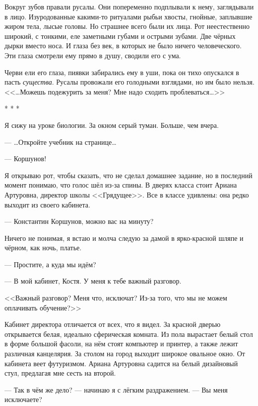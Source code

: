 \documentclass[openany, oneside]{book}
\begin{document}
Вокруг зубов правали русалы. Они попеременно подплывали к нему, заглядывали в лицо. Изуродованные какими-то ритуалами рыбьи хвосты, гнойные, заплывшие жиром тела, лысые головы. Но страшнее всего были их лица. Рот неестественно широкий, с тонкими, еле заметными губами и острыми зубами. Две чёрных дырки вместо носа. И глаза без век, в которых не было ничего человеческого. Эти глаза смотрели ему прямо в душу, сводили его с ума.

Черви ели его глаза, пиявки забирались ему в уши, пока он тихо опускался в пасть \textit{существа}. Русалы провожали его голодными взглядами, но им было нельзя.\\

<<\dots Можешь подежурить за меня? Мне надо сходить проблеваться\dots>>

\begin{center}
    * * *
\end{center}

Я сижу на уроке биологии. За окном серый туман. Больше, чем вчера.

--- \dots Откройте учебник на странице\dots

--- Коршунов!

Я открываю рот, чтобы сказать, что не сделал домашнее задание, но в последний момент понимаю, что голос шёл из-за спины. В дверях класса стоит Ариана Артуровна, директор школы <<Грядущее>>. Все в классе удивлены: она редко выходит из своего кабинета.

--- Константин Коршунов, можно вас на минуту?

Ничего не понимая, я встаю и молча следую за дамой в ярко-красной шляпе и чёрном, как ночь, платье.

--- Простите, а куда мы идём?

--- В мой кабинет, Костя. У меня к тебе важный разговор.

<<Важный разговор? Меня что, исключат? Из-за того, что мы не можем оплачивать обучение?>>

Кабинет директора отличается от всех, что я видел. За красной дверью открывается белая, идеально сферическая комната. Из пола вырастает белый стол в форме большой фасоли, на нём стоят компьютер и принтер, а также лежит различная канцелярия. За столом на город выходит широкое овальное окно. От кабинета веет футуризмом. Ариана Артуровна садится на белый дизайновый стул, предлагая мне сесть на второй.

--- Так в чём же дело? --- начинаю я с лёгким раздражением. --- Вы меня исключаете?
\end{document}
